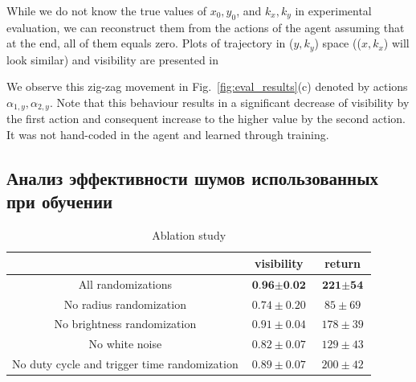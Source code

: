 While we do not know the true values of $x_0, y_0$, and $k_x, k_y$ in experimental evaluation, we can reconstruct them from the actions of the agent assuming that at the end, all of them equals zero. Plots of trajectory in ($y, k_y$) space (($x, k_x$) will look similar) and visibility are presented in 

We observe this zig-zag movement in Fig.~\ref{fig:eval_results}(c) denoted by actions $\alpha_{1, y}, \alpha_{2, y}$. Note that this behaviour results in a significant decrease of visibility by the first action and consequent increase to the higher value by the second action. It was not hand-coded in the agent and learned through training.


\subsection{Анализ эффективности шумов использованных при обучении}

\begin{table}[ht]
\caption{Ablation study}
\centering
\begin{tabular}{c|c|c}
\toprule
{} & visibility & return \\
\midrule
All randomizations  & $\textbf{0.96} \pm \textbf{0.02}$ & $\textbf{221} \pm \textbf{54}$ \\
No radius randomization & $0.74 \pm 0.20$ & $85 \pm 69$ \\
No brightness randomization& $0.91 \pm 0.04$ & $178 \pm 39$ \\
No white noise & $0.82 \pm 0.07$ & $129 \pm 43$ \\
No duty cycle and trigger time randomization  &  $0.89 \pm 0.07$ & $200 \pm 42$ \\


\bottomrule
\end{tabular}

\label{tab:abl}
\end{table}

